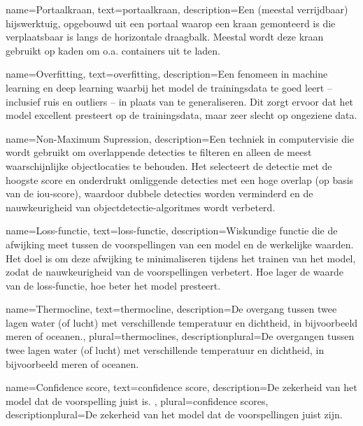 {
    name={Portaalkraan},
    text={portaalkraan},
    description={Een (meestal verrijdbaar) hijswerktuig, opgebouwd uit een portaal waarop een kraan gemonteerd is die verplaatsbaar is langs de horizontale draagbalk. Meestal wordt deze kraan gebruikt op kaden om o.a. containers uit te laden.}
}

{
    name={Overfitting},
    text={overfitting},
    description={Een fenomeen in machine learning en deep learning waarbij het model de trainingsdata te goed leert -- inclusief ruis en outliers -- in plaats van te generaliseren. Dit zorgt ervoor dat het model excellent presteert op de trainingsdata, maar zeer slecht op ongeziene data.}
}

{
    name={Non-Maximum Supression},
    description={Een techniek in computervisie die wordt gebruikt om overlappende detecties te filteren en alleen de meest waarschijnlijke objectlocaties te behouden. Het selecteert de detectie met de hoogste score en onderdrukt omliggende detecties met een hoge overlap (op basis van de \gls{iou}-score), waardoor dubbele detecties worden verminderd en de nauwkeurigheid van objectdetectie-algoritmes wordt verbeterd. \autocite{Geron_2023}}
}

{
    name={Loss-functie},
    text={loss-functie},
    description={Wiskundige functie die de afwijking meet tussen de voorspellingen van een model en de werkelijke waarden. Het doel is om deze afwijking te minimaliseren tijdens het trainen van het model, zodat de nauwkeurigheid van de voorspellingen verbetert. Hoe lager de waarde van de loss-functie, hoe beter het model presteert. \autocite{Geron_2023}}
}

{
    name={Thermocline},
    text={thermocline},
    description={De overgang tussen twee lagen water (of lucht) met verschillende temperatuur en dichtheid, in bijvoorbeeld meren of oceanen.},
    plural={thermoclines},
    descriptionplural={De overgangen tussen twee lagen water (of lucht) met verschillende temperatuur en dichtheid, in bijvoorbeeld meren of oceanen.}
}

{
    name={Confidence score},
    text={confidence score},
    description={De zekerheid van het model dat de voorspelling juist is. \autocite{Geron_2023}},
    plural={confidence scores},
    descriptionplural={De zekerheid van het model dat de voorspellingen juist zijn. \autocite{Geron_2023}}    
}

